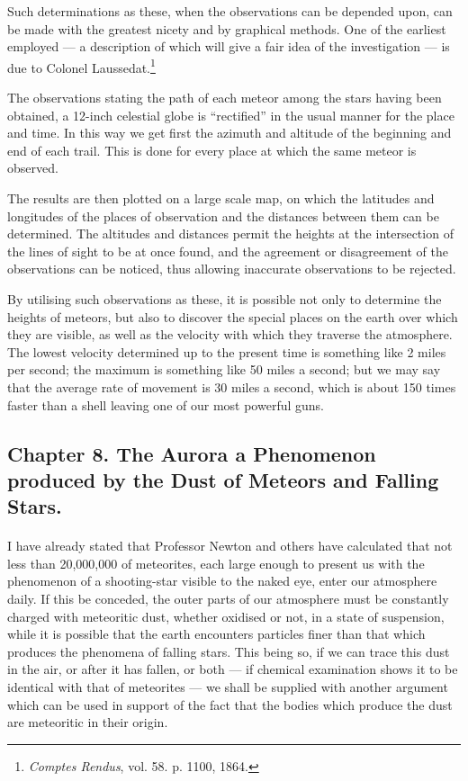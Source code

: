 \documentclass[a4paper, 12pt, oneside, polutonikogreek, english]{article}
\begin{document}
Such determinations as these, when the observations can be depended upon, can be made with the greatest nicety and by graphical methods. One of the earliest employed --- a description of which will give a fair idea of the investigation --- is due to Colonel Laussedat.\footnote{\emph{Comptes Rendus}, vol. 58. p. 1100, 1864.}

The observations stating the path of each meteor among the stars having been obtained, a 12-inch celestial globe is ``rectified'' in the usual manner for the place and time. In this way we get first the azimuth and altitude of the beginning and end of each trail. This is done for every place at which the same meteor is observed.

The results are then plotted on a large scale map, on which the latitudes and longitudes of the places of observation and the distances between them can be determined. The altitudes and distances permit the heights at the intersection of the lines of sight to be at once found, and the agreement or disagreement of the observations can be noticed, thus allowing inaccurate observations to be rejected.

By utilising such observations as these, it is possible not only to determine the heights of meteors, but also to discover the special places on the earth over which they are visible, as well as the velocity with which they traverse the atmosphere. The lowest velocity determined up to the present time is something like 2 miles per second; the maximum is something like 50 miles a second; but we may say that the average rate of movement is 30 miles a second, which is about 150 times faster than a shell leaving one of our most powerful guns.
\clearpage
\subsection{Chapter 8. The Aurora a Phenomenon produced by the Dust of Meteors and Falling Stars.}
\paragraph{}
I have already stated that Professor Newton and others have calculated that not less than 20,000,000 of meteorites, each large enough to present us with the phenomenon of a shooting-star visible to the naked eye, enter our atmosphere daily. If this be conceded, the outer parts of our atmosphere must be constantly charged with meteoritic dust, whether oxidised or not, in a state of suspension, while it is possible that the earth encounters particles finer than that which produces the phenomena of falling stars. This being so, if we can trace this dust in the air, or after it has fallen, or both --- if chemical examination shows it to be identical with that of meteorites --- we shall be supplied with another argument which can be used in support of the fact that the bodies which produce the dust are meteoritic in their origin.
\end{document}

